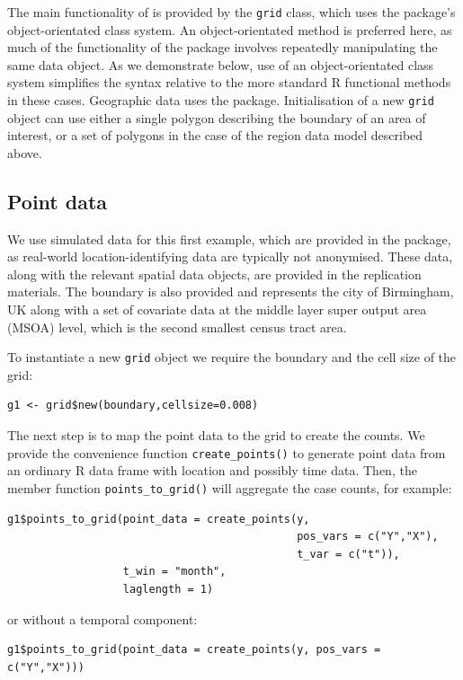 The main functionality of  is provided by the \texttt{grid} class, which uses the  package's object-orientated class system. An object-orientated method is preferred here, as much of the functionality of the package involves repeatedly manipulating the same data object. As we demonstrate below, use of an object-orientated class system simplifies the syntax relative to the more standard R functional methods in these cases. Geographic data uses the  package. Initialisation of a new \texttt{grid} object can use either a single polygon describing the boundary of an area of interest, or a set of polygons in the case of the region data model described above.

\subsection{Point data}
We use simulated data for this first example, which are provided in the package, as real-world location-identifying data are typically not anonymised. These data, along with the relevant spatial data objects, are provided in the replication materials. The boundary is also provided and represents the city of Birmingham, UK along with a set of covariate data at the middle layer super output area (MSOA) level, which is the second smallest census tract area. 

To instantiate a new \texttt{grid} object we require the boundary and the cell size of the grid:

\begin{lstlisting}
g1 <- grid$new(boundary,cellsize=0.008)
\end{lstlisting}

The next step is to map the point data to the grid to create the counts. We provide the convenience function \texttt{create\_points()} to generate  point data from an ordinary R data frame with location and possibly time data. Then, the member function \texttt{points\_to\_grid()} will aggregate the case counts, for example:

\begin{lstlisting}
g1$points_to_grid(point_data = create_points(y,
                                             pos_vars = c("Y","X"),
                                             t_var = c("t")),
                  t_win = "month",
                  laglength = 1)
\end{lstlisting}
or without a temporal component:
\begin{lstlisting}
g1$points_to_grid(point_data = create_points(y, pos_vars = c("Y","X")))
\end{lstlisting}

